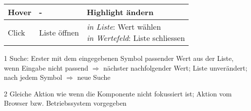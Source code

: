 \begin{table}[!htb]
\begin{adjustbox}{max width=\textwidth}
\begin{threeparttable}
\begin{tabular}{ l || l | l }
                \hline
                Hover      & -                & Highlight ändern \\
                \hline
                Click      & Liste öffnen     & \tbbr{\emph{in Liste}: Wert wählen \\
                                                      \emph{in Wertefeld}: Liste schliessen} \\
                \hline
            \end{tabular}
            \begin{tablenotes}
                \scriptsize
                \item[1] Suche: Erster mit dem eingegebenen Symbol passender Wert aus der Liste, wenn Eingabe nicht passend $\Rightarrow$ nächster nachfolgender Wert; 
                                Liste unverändert; nach jedem Symbol $\Rightarrow$ neue Suche
                \item[2] Gleiche Aktion wie wenn die Komponente nicht fokussiert ist; Aktion vom Browser bzw. Betriebssystem vorgegeben
            \end{tablenotes}
        \end{threeparttable}
    \end{adjustbox}
\end{table}

